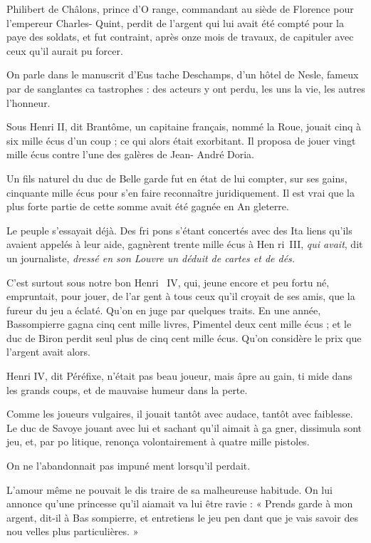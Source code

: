 Philibert de Châlons, prince d'O%
range, commandant au siède de
Florence pour l'empereur Charles-%
Quint, perdit de l'argent qui lui avait
été compté pour la paye des soldats,
et fut contraint, après onze mois de
travaux, de capituler avec ceux qu'il
aurait pu forcer.

On parle dans le manuscrit d'Eus%
tache Deschamps, d'un hôtel de
Nesle, fameux par de sanglantes ca%
tastrophes : des acteurs y ont perdu,
les uns la vie, les autres l'honneur.

Sous Henri II, dit Brantôme, un
capitaine français, nommé la Roue,
jouait cinq à six mille écus d'un
coup ; ce qui alors était exorbitant.
Il proposa de jouer vingt mille écus
contre l'une des galères de Jean-%
André Doria.

Un fils naturel du duc de Belle\-%
garde fut en état de lui compter, sur
ses gains, cinquante mille écus pour
s'en faire reconnaître juridiquement.
Il est vrai que la plus forte partie de
cette somme avait été gagnée en An%
gleterre.

Le peuple s'essayait déjà. Des fri%
pons s'étant concertés avec des Ita%
liens qu'ils avaient appelés à leur aide,
gagnèrent trente mille écus à Hen%
ri~III, \emph{qui avait}, dit un journaliste,
\emph{dressé en son Louvre un déduit de
cartes et de dés.}

C'est surtout sous notre bon Henri~
IV, qui, jeune encore et peu fortu%
né, empruntait, pour jouer, de l'ar%
gent à tous ceux qu'il croyait de ses
amis, que la fureur du jeu a éclaté.
Qu'on en juge par quelques traits. En
une année, Bassompierre gagna cinq
cent mille livres, Pimentel deux cent
mille écus ; et le duc de Biron perdit
seul plus de cinq cent mille écus.
Qu'on considère le prix que l'argent
avait alors.

Henri IV, dit Péréfixe, n'était pas
beau joueur, mais âpre au gain, ti%
mide dans les grands coups, et de
mauvaise humeur dans la perte.

Comme les joueurs vulgaires, il
jouait tantôt avec audace, tantôt avec
faiblesse. Le duc de Savoye jouant
avec lui et sachant qu'il aimait à ga%
gner, dissimula sont jeu, et, par po%
litique, renonça volontairement à
quatre mille pistoles.

On ne l'abandonnait pas impuné%
ment lorsqu'il perdait.

L'amour même ne pouvait le dis%
traire de sa malheureuse habitude.
On lui annonce qu'une princesse
qu'il aiamait va lui être ravie : « Prends
garde à mon argent, dit-il à Bas%
sompierre, et entretiens le jeu pen%
dant que je vais savoir des nou%
velles plus particulières. »

